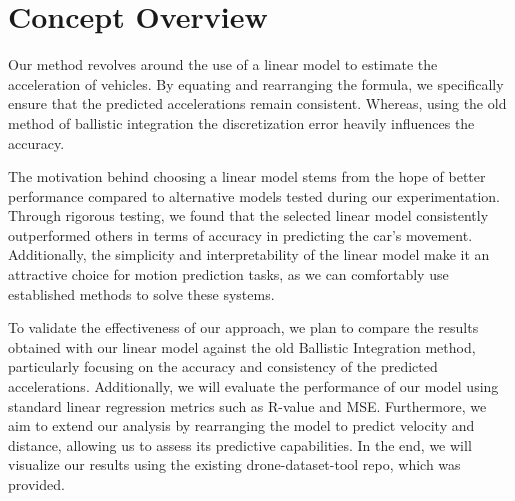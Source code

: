 \section{Concept Overview}


Our method revolves around the use of a linear model to estimate the acceleration of vehicles.
By equating and rearranging the formula, we specifically ensure that the predicted accelerations remain consistent. 
Whereas, using the old method of ballistic integration the discretization error heavily influences the accuracy.

The motivation behind choosing a linear model stems from the hope of better performance compared 
to alternative models tested during our experimentation. 
Through rigorous testing, we found that the selected linear model consistently outperformed others in 
terms of accuracy in predicting the car's movement. 
Additionally, the simplicity and interpretability of the linear model make it an attractive choice for 
motion prediction tasks, as we can comfortably use established methods to solve these systems. 

To validate the effectiveness of our approach, we plan to compare the results obtained with our linear 
model against the old Ballistic Integration method, particularly focusing on the accuracy and consistency of 
the predicted accelerations. 
Additionally, we will evaluate the performance of our model using standard linear regression metrics such as 
R-value and MSE. 
Furthermore, we aim to extend our analysis by rearranging the model to predict velocity and distance, 
allowing us to assess its predictive capabilities.
In the end, we will visualize our results using the existing drone-dataset-tool repo, 
which was provided.



